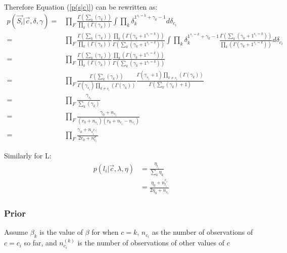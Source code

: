 Therefore Equation (\ref{p(s|c)}) can be rewritten as:
\begin{equation}
\begin{split}
p(\vec{S_{i}}| \vec{c}, \delta, \gamma)
= & \prod_{F} \frac{\Gamma(\sum_{k}(\gamma_{k}))}{\prod_{k}(\Gamma(\gamma_{k}))}%
\int \prod_{k}\delta_{k}^{1^{s_{i}=k}+\gamma_{k}-1}d\delta_{c_{i}}\\
=&\prod_{F} \frac{\Gamma(\sum_{k}(\gamma_{k}))}{\prod_{k}(\Gamma(\gamma_{k}))}%
\frac{\prod_{k}(\Gamma(\gamma_{k}+1^{s_{i}=k}))}{\Gamma(\sum_{k}(\gamma_{k}+1^{s_{i}=k}))} %
\int \prod_{k}\delta_{k}^{1^{s_{i}=k}+\gamma_{k}-1}
\frac{\Gamma(\sum_{k}(\gamma_{k}+1^{s_{i}=k}))}{\prod_{k}(\Gamma(\gamma_{k}+1^{s_{i}=k}))}%
d\delta_{c_{i}}\\
=&\prod_{F} \frac{\Gamma(\sum_{k}(\gamma_{k}))}{\prod_{k}(\Gamma(\gamma_{k}))}%
\frac{\prod_{k}(\Gamma(\gamma_{k}+1^{s_{i}=k}))}{\Gamma(\sum_{k}(\gamma_{k}+1^{s_{i}=k}))}\\ %
=&\prod_{F}\frac{\Gamma(\sum_{k}(\gamma_{k}))}{\Gamma(\gamma_{s_{i}})\prod_{k\neq s_{i}}(\Gamma(\gamma_{k}))}%
\frac{\Gamma(\gamma_{s_{i}}+1)\prod_{k\neq s_{i}}(\Gamma(\gamma_{k}))}{\Gamma(\sum_{k}(\gamma_{k})+1)}\\%
=&\prod_{F}\frac{\gamma_{s_{i}}}{\sum_{k}(\gamma_{k})}\\%
=&\prod_{F}\frac{\gamma_{0}+n_{s_{i}}}{(r_{0}+n_{s_{i}})(r_{0}+n_{c_{i}}-n_{s_{i}})}\\%
=& \prod_{F}\frac{\gamma_{0}+n_{s^{F, c_{i}}_{i}}}{2r_{0}+n^{F}_{c_{i}}}
\end{split}
\end{equation}

Similarly for L:
\begin{equation}
\begin{split}
p(l_{i} |\vec{c},\lambda, \eta) &= \frac{\eta_{l_{i}}}{\sum_{k}{\eta_{k}}}\\
&= \frac{\eta_{0}+n_{l_{i}}^{c_{i}}}{2\eta_{0}+n_{c_{i}}}
\end{split}
\end{equation}

\subsubsection{Prior}
Assume $\beta_{k}$ is the value of $\beta$ for when $c = k$, $n_{c_{i}}$ as the number of observations of $c=c_{i}$ so far, and  $n_{c_{i}}^{(k)}$ is the number of observations of other values of $c$ 

